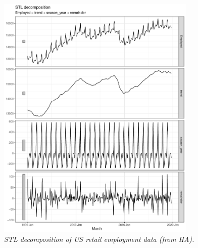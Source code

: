 \documentclass{article}
\begin{document}
\begin{figure}[ht]
\centering
\includegraphics[width=0.85\textwidth]{fig/stl-1.pdf}
\caption{\it STL decomposition of US retail employment data (from HA).}  
\label{fig:stl}
\end{figure}
\end{document}
